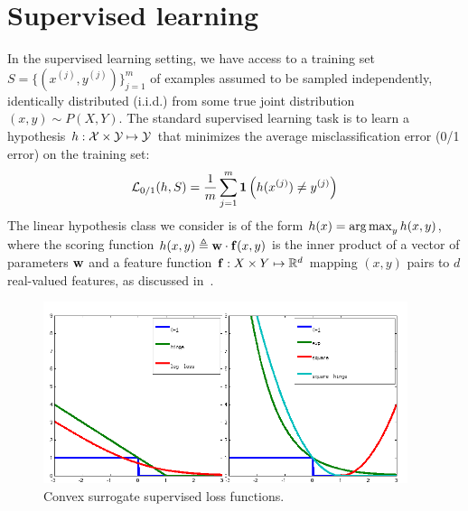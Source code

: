 \section{Supervised learning}
In the supervised learning setting, we have access to a training set
$S = \{(x^{(j)},y^{(j)})\}_{j=1}^m$ of examples assumed to be sampled 
independently, identically distributed (i.i.d.) from some true joint 
distribution $(x,y) \sim P(X,Y)$. The standard supervised learning task is to 
learn a hypothesis $h: \mathcal{X} \times \mathcal{Y} \mapsto \mathcal{Y}$ that minimizes the average misclassification error (0/1 error) on the training set: 
\begin{align}
\mathcal{L}_{0/1}(h,S) = \frac{1}{m}\sum_{j=1}^m \mathbf{1}\left(h(x^{(j)}) \neq y^{(j)}\right)
\end{align}
The linear hypothesis class we consider is of the form $h(x) = \mathop{\arg\max}_y h(x,y)$, where the
scoring function $h(x,y) \triangleq \mathbf{w} \cdot \mathbf{f}(x,y)$ is the
inner product of a vector of parameters $\mathbf{w}$ and a feature
function $\mathbf{f}: X \times Y \mapsto \mathbb{R}^d$ mapping $(x,y)$ pairs to
$d$ real-valued features, as discussed in~.  

\begin{figure}[tb]
\begin{center}
\includegraphics[width=0.95\textwidth]{figs/losses.png}
\caption[Convex surrogate supervised loss functions.]{Convex surrogate supervised loss functions.}
\label{fig:surrogates}
\end{center}
\end{figure}

